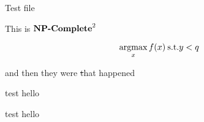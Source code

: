 \documentclass[12pt]{article}
\begin{document}
Test file

This is \({{\textbf{NP-Complete}}}^2\)


\[
  \operatorname*{argmax}_x f(x) \: \text{s.t.} y < q
\]



and then they were \st that happened


\begin{problem}
  test hello
\end{problem}


\begin{solution*}[annotate]
  test hello
\end{solution*}
\end{document}
